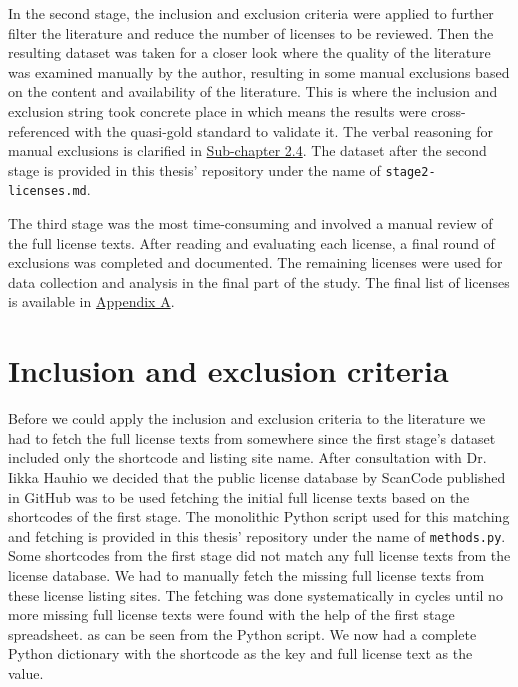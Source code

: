 In the second stage, the inclusion and exclusion criteria were applied to further filter the literature and reduce the number of licenses to be reviewed. Then the resulting dataset was taken for a closer look where the quality of the literature was examined manually by the author, resulting in some manual exclusions based on the content and availability of the literature. This is where the inclusion and exclusion string took concrete place in which means the results were cross-referenced with the quasi-gold standard to validate it. The verbal reasoning for manual exclusions is clarified in \hyperref[incexc-criteria]{Sub-chapter 2.4}. The dataset after the second stage is provided in this thesis' repository \citep{mscthesis} under the name of \texttt{stage2-licenses.md}.

The third stage was the most time-consuming and involved a manual review of the full license texts. After reading and evaluating each license, a final round of exclusions was completed and documented. The remaining licenses were used for data collection and analysis in the final part of the study. The final list of licenses is available in \hyperref[appendix:a]{Appendix A}.

\section{Inclusion and exclusion criteria\label{incexc-criteria}}
Before we could apply the inclusion and exclusion criteria to the literature we had to fetch the full license texts from somewhere since the first stage's dataset included only the shortcode and listing site name. After consultation with Dr. Iikka Hauhio \citep{scholar:hauhio} we decided that the public license database by ScanCode published in GitHub \citep{scancode} was to be used fetching the initial full license texts based on the shortcodes of the first stage. The monolithic Python script used for this matching and fetching is provided in this thesis' repository \citep{mscthesis} under the name of \texttt{methods.py}. Some shortcodes from the first stage did not match any full license texts from the license database. We had to manually fetch the missing full license texts from these license listing sites. The fetching was done systematically in cycles until no more missing full license texts were found with the help of the first stage spreadsheet. as can be seen from the Python script. We now had a complete Python dictionary with the shortcode as the key and full license text as the value.

